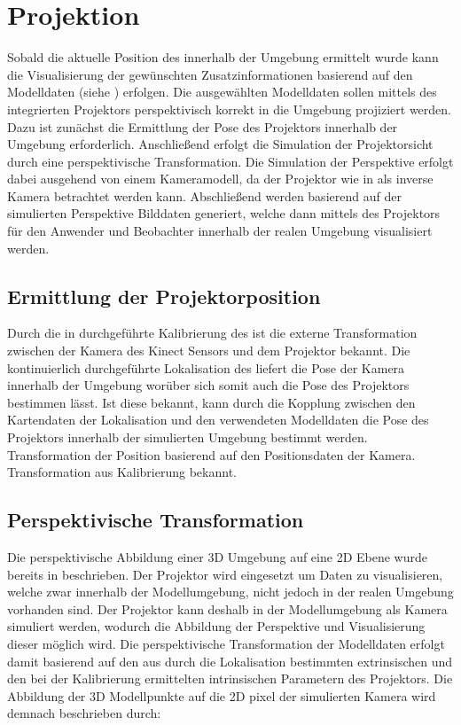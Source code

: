 \chapter{Projektion}
Sobald die aktuelle Position des  innerhalb der Umgebung ermittelt wurde kann die Visualisierung der gewünschten Zusatzinformationen basierend auf den Modelldaten (siehe ) erfolgen. Die ausgewählten Modelldaten sollen mittels des integrierten Projektors perspektivisch korrekt in die Umgebung projiziert werden. Dazu ist zunächst die Ermittlung der Pose des Projektors innerhalb der Umgebung erforderlich. Anschließend erfolgt die Simulation der Projektorsicht durch eine perspektivische Transformation. Die Simulation der Perspektive erfolgt dabei ausgehend von einem Kameramodell, da der Projektor wie in  als inverse Kamera betrachtet werden kann. Abschließend werden basierend auf der simulierten Perspektive Bilddaten generiert, welche dann mittels des Projektors für den Anwender und Beobachter innerhalb der realen Umgebung visualisiert werden.

\section{Ermittlung der Projektorposition}
Durch die in  durchgeführte Kalibrierung des  ist die externe Transformation zwischen der Kamera des Kinect Sensors und dem Projektor bekannt. Die kontinuierlich durchgeführte Lokalisation des  liefert die Pose der Kamera innerhalb der Umgebung worüber sich somit auch die Pose des Projektors bestimmen lässt. Ist diese bekannt, kann durch die Kopplung zwischen den Kartendaten der Lokalisation und den verwendeten Modelldaten die Pose des Projektors innerhalb der simulierten Umgebung bestimmt werden.
Transformation der Position basierend auf den Positionsdaten der Kamera. Transformation aus Kalibrierung bekannt.\\

\section{Perspektivische Transformation}
Die perspektivische Abbildung einer 3D Umgebung auf eine 2D Ebene wurde bereits in  beschrieben. Der Projektor wird eingesetzt um Daten zu visualisieren, welche zwar innerhalb der Modellumgebung, nicht jedoch in der realen Umgebung vorhanden sind. Der Projektor kann deshalb in der Modellumgebung als Kamera simuliert werden, wodurch die Abbildung der Perspektive und Visualisierung dieser möglich wird. Die perspektivische Transformation der Modelldaten erfolgt damit basierend auf den aus durch die Lokalisation bestimmten extrinsischen und den bei der Kalibrierung ermittelten intrinsischen Parametern des Projektors. Die Abbildung der 3D Modellpunkte auf die 2D pixel der simulierten Kamera wird demnach beschrieben durch:

